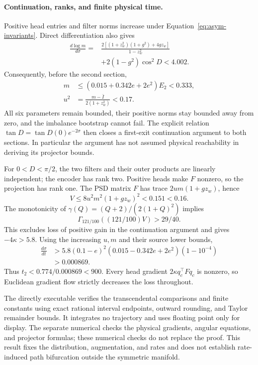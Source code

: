 \paragraph{Continuation, ranks, and finite physical time.}
Positive head entries and filter norms increase under Equation~\eqref{eq:asym-invariants}. Direct differentiation also gives
\begin{align}
 \frac{d\log m}{d\sigma}
 ={}&\frac{2[(1+z_w^2)(1+g^2)+4gz_w]}{1-z_w^2}\\
 &+2(1-g^2)\cos^2D<4.002.\nonumber
\end{align}
Consequently, before the second section,
\begin{align}
 m&\le(0.015+0.342e+2e^2)E_2<0.333,\\
 u^2&=\frac{m-\bar I}{2(1+z_w^2)}<0.17.
\end{align}
All six parameters remain bounded, their positive norms stay bounded away from zero, and the imbalance bootstrap cannot fail. The explicit relation $\tan D=\tan D(0)e^{-2\sigma}$ then closes a first-exit continuation argument to both sections. In particular the argument has not assumed physical reachability in deriving its projector bounds.

For $0<D<\pi/2$, the two filters and their outer products are linearly independent; the encoder has rank two. Positive heads make $F$ nonzero, so the projection has rank one. The PSD matrix $F$ has trace $2um(1+gz_w)$, hence
\begin{equation}
 V\le8u^2m^2(1+gz_w)^2<0.151<0.16.
\end{equation}
The monotonicity of $\gamma(Q)=(Q+2)/(2(1+Q)^2)$ implies
\begin{equation}
 \Gamma_{121/100}((121/100)V)>29/40.
\end{equation}
This excludes loss of positive gain in the continuation argument and gives $-4\kappa>5.8$. Using the increasing $u,m$ and their source lower bounds,
\begin{align}
 \frac{d\sigma}{dt}
 &>5.8(0.1-e)^2(0.015-0.342e+2e^2)(1-10^{-4})\\
 &>0.000869.\nonumber
\end{align}
Thus $t_2<0.774/0.000869<900$. Every head gradient $2\kappa q_c^\top Fq_c$ is nonzero, so Euclidean gradient flow strictly decreases the loss throughout.

The directly executable  verifies the transcendental comparisons and finite constants using exact rational interval endpoints, outward rounding, and Taylor remainder bounds. It integrates no trajectory and uses floating point only for display. The separate numerical  checks the physical gradients, angular equations, and projector formulas; these numerical checks do not replace the proof. This result fixes the distribution, augmentation, and rates and does not establish rate-induced path bifurcation outside the symmetric manifold.
